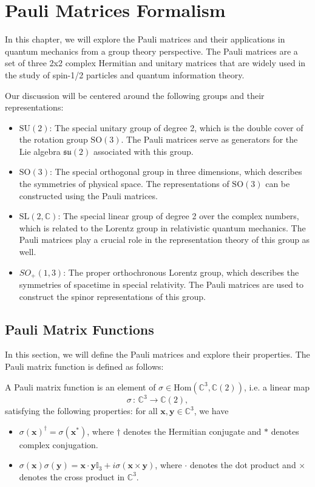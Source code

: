 \chapter{Pauli Matrices Formalism}

In this chapter, we will explore the Pauli matrices and their applications in quantum mechanics from a group theory perspective. The Pauli matrices are a set of three 2x2 complex Hermitian and unitary matrices that are widely used in the study of spin-1/2 particles and quantum information theory.

Our discussion will be centered around the following groups and their representations:
\begin{itemize}
    \item \(\mathrm{SU}(2)\): The special unitary group of degree 2, which is the double cover of the rotation group \(\mathrm{SO}(3)\). The Pauli matrices serve as generators for the Lie algebra \(\mathfrak{su}(2)\) associated with this group.
    \item \(\mathrm{SO}(3)\): The special orthogonal group in three dimensions, which describes the symmetries of physical space. The representations of \(\mathrm{SO}(3)\) can be constructed using the Pauli matrices.
    \item \(\mathrm{SL}(2, \mathbb{C})\): The special linear group of degree 2 over the complex numbers, which is related to the Lorentz group in relativistic quantum mechanics. The Pauli matrices play a crucial role in the representation theory of this group as well.
    \item \(SO_+(1,3)\): The proper orthochronous Lorentz group, which describes the symmetries of spacetime in special relativity. The Pauli matrices are used to construct the spinor representations of this group.
\end{itemize}

\section{Pauli Matrix Functions}

In this section, we will define the Pauli matrices and explore their properties. The Pauli matrix function is defined as follows:

\begin{definition}
    A Pauli matrix function is an element of \(\sigma \in \mathrm{Hom}(\mathbb{C}^3, \mathbb{C}(2))\), i.e. a linear map
    \[
        \sigma \, : \, \mathbb{C}^3 \to \mathbb{C}(2),
    \]
    satisfying the following properties: for all \(\mathbf{x}, \mathbf{y} \in \mathbb{C}^3\), we have
    \begin{itemize}
        \item \(\sigma(\mathbf{x})^{\dagger} = \sigma(\mathbf{x}^*)\), where \(\dagger\) denotes the Hermitian conjugate and \(*\) denotes complex conjugation.
        \item \(\sigma(\mathbf{x}) \sigma(\mathbf{y}) = \mathbf{x} \cdot \mathbf{y} \mathbb{I}_3 + i \sigma (\mathbf{x} \times \mathbf{y})\), where \(\cdot\) denotes the dot product and \(\times\) denotes the cross product in \(\mathbb{C}^3\).
    \end{itemize}
\end{definition}

